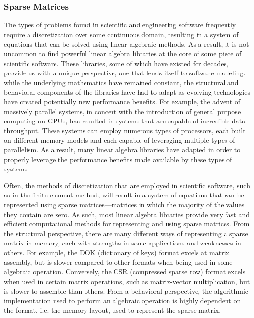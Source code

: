 \documentclass[../../proposal.tex]{subfiles}
\begin{document}

\subsubsection{Sparse Matrices}

The types of problems found in scientific and engineering software frequently require a discretization over some continuous domain, resulting in a system of equations that can be solved using linear algebraic methods.  As a result, it is not uncommon to find powerful linear algebra libraries at the core of some piece of scientific software.  These libraries, some of which have existed for decades, provide us with a unique perspective, one that lends itself to software modeling: while the underlying mathematics have remained constant, the structural and behavioral components of the libraries have had to adapt as evolving technologies have created potentially new performance benefits.  For example, the advent of massively parallel systems, in concert with the introduction of general purpose computing on GPUs, has resulted in systems that are capable of incredible data throughput.  These systems can employ numerous types of processors, each built on different memory models and each capable of leveraging multiple types of parallelism.  As a result, many linear algebra libraries have adapted in order to properly leverage the performance benefits made available by these types of systems.

Often, the methods of discretization that are employed in scientific software, such as in the finite element method, will result in a system of equations that can be represented using sparse matrices---matrices in which the majority of the values they contain are zero.  As such, most linear algebra libraries provide very fast and efficient computational methods for representing and using sparse matrices.  From the structural perspective, there are many different ways of representing a sparse matrix in memory, each with strengths in some applications and weaknesses in others.  For example, the DOK (dictionary of keys) format excels at matrix assembly, but is slower compared to other formats when being used in some algebraic operation.  Conversely, the CSR (compressed sparse row) format excels when used in certain matrix operations, such as matrix-vector multiplication, but is slower to assemble than others.  From a behavioral perspective, the algorithmic implementation used to perform an algebraic operation is highly dependent on the format, i.e. the memory layout, used to represent the sparse matrix.
\end{document}
